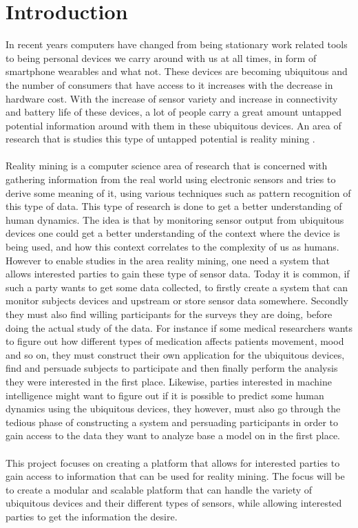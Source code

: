 \chapter{Introduction}
\label{cha:introduction}

In recent years computers have changed from being stationary work related tools to being personal devices we carry around with us at all times, in form of smartphone wearables and what not. These devices are becoming ubiquitous and the number of consumers that have access to it increases with the decrease in hardware cost. With the increase of sensor variety and increase in connectivity and battery life of these devices, a lot of people carry a great amount untapped potential information around with them in these ubiquitous devices.  An area of research that is studies this type of untapped potential is reality mining .
\\\\
Reality mining is a computer science area of research that is concerned with gathering information from the real world using electronic sensors and tries to derive some meaning of it, using various techniques such as pattern recognition of this type of data. This type of research is done to get a better understanding of human dynamics. The idea is that by monitoring sensor output from ubiquitous devices one could get a better understanding of the context where the device is being used, and how this context correlates to the complexity of us as humans. However to enable studies in the area reality mining, one need a system that allows interested parties to gain these type of sensor data. Today it is common, if such a party wants to get some data collected, to firstly create a system that can monitor subjects devices and upstream or store sensor data somewhere. Secondly they must also find willing participants for the surveys they are doing, before doing the actual study of the data. For instance if some medical researchers wants to figure out how different types of medication affects patients movement, mood and so on, they must construct their own application for the ubiquitous devices, find and persuade subjects to participate and then finally perform the analysis they were interested in the first place. Likewise, parties interested in machine intelligence might want to figure out if it is possible to predict some human dynamics using the ubiquitous devices, they however, must also go through the tedious phase of constructing a system and persuading participants in order to gain access to the data they want to analyze base a model on in the first place.
\\\\
This project focuses on creating a platform that allows for interested parties to gain access to information that can be used for reality mining. The focus will be to create a modular and scalable platform that can handle the variety of ubiquitous devices and their different types of sensors, while allowing interested parties to get the information the desire.

